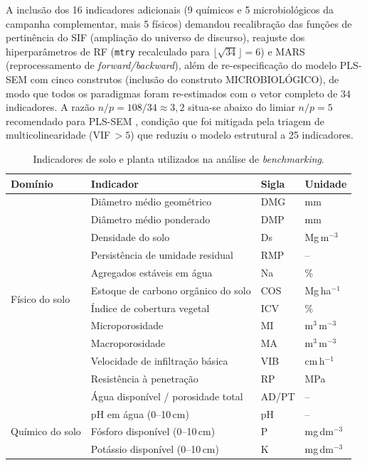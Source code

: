\documentclass[pdflatex,sn-basic]{sn-jnl}%
\begin{document}
A inclusão dos 16 indicadores adicionais (9 químicos e 5 microbiológicos da campanha complementar, mais 5 físicos) demandou recalibração das funções de pertinência do SIF (ampliação do universo de discurso), reajuste dos hiperparâmetros de RF (\texttt{mtry} recalculado para $\lfloor \sqrt{34} \rfloor = 6$) e MARS (reprocessamento de \textit{forward/backward}), além de re-especificação do modelo PLS-SEM com cinco construtos (inclusão do construto MICROBIOLÓGICO), de modo que todos os paradigmas foram re-estimados com o vetor completo de 34 indicadores. A razão $n/p = 108/34 \approx 3{,}2$ situa-se abaixo do limiar $n/p = 5$ recomendado para PLS-SEM \citep{Hair2019}, condição que foi mitigada pela triagem de multicolinearidade (VIF\,$> 5$) que reduziu o modelo estrutural a 25 indicadores.

\begin{table}[h]
\caption{Indicadores de solo e planta utilizados na análise de \textit{benchmarking}.}\label{tab:indicators}
\begin{tabular*}{\textwidth}{@{\extracolsep\fill}llll}
\toprule
Domínio & Indicador & Sigla & Unidade \\
\midrule
\multirow{12}{*}{Físico do solo} 
  & Diâmetro médio geométrico & DMG & mm \\
  & Diâmetro médio ponderado & DMP & mm \\
  & Densidade do solo & Ds & Mg\,m$^{-3}$ \\
  & Persistência de umidade residual & RMP & -- \\
  & Agregados estáveis em água & Na & \% \\
  & Estoque de carbono orgânico do solo & COS & Mg\,ha$^{-1}$ \\
  & Índice de cobertura vegetal & ICV & \% \\
  & Microporosidade & MI & m$^3$\,m$^{-3}$ \\
  & Macroporosidade & MA & m$^3$\,m$^{-3}$ \\
  & Velocidade de infiltração básica & VIB & cm\,h$^{-1}$ \\
  & Resistência à penetração & RP & MPa \\
  & Água disponível / porosidade total & AD/PT & -- \\
\midrule
\multirow{9}{*}{Químico do solo}
  & pH em água (0--10\,cm) & pH & -- \\
  & Fósforo disponível (0--10\,cm) & P & mg\,dm$^{-3}$ \\
  & Potássio disponível (0--10\,cm) & K & mg\,dm$^{-3}$ \\

\end{tabular*}
\end{table}
\end{document}
